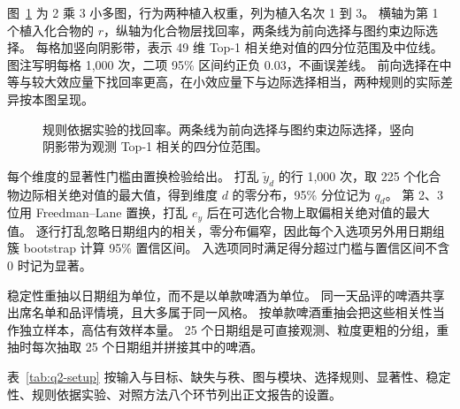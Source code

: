 图~\ref{fig:q2-recovery} 为 2 乘 3 小多图，行为两种植入权重，列为植入名次 1 到 3。
横轴为第 1 个植入化合物的 $r$，纵轴为化合物层找回率，两条线为前向选择与图约束边际选择。
每格加竖向阴影带，表示 49 维 Top-1 相关绝对值的四分位范围及中位线。
图注写明每格 1,000 次，二项 95\% 区间约正负 0.03，不画误差线。
前向选择在中等与较大效应量下找回率更高，在小效应量下与边际选择相当，两种规则的实际差异按本图呈现。

\begin{figure}[htbp]\centering
{}
\caption{规则依据实验的找回率。两条线为前向选择与图约束边际选择，竖向阴影带为观测 Top-1 相关的四分位范围。}
\label{fig:q2-recovery}
\end{figure}

每个维度的显著性门槛由置换检验给出。
打乱 $\tilde y_d$ 的行 1,000 次，取 225 个化合物边际相关绝对值的最大值，得到维度 $d$ 的零分布，95\% 分位记为 $q_d$。
第 2、3 位用 Freedman--Lane 置换，打乱 $e_y$ 后在可选化合物上取偏相关绝对值的最大值。
逐行打乱忽略日期组内的相关，零分布偏窄，因此每个入选项另外用日期组簇 bootstrap 计算 95\% 置信区间。
入选项同时满足得分超过门槛与置信区间不含 0 时记为显著。

稳定性重抽以日期组为单位，而不是以单款啤酒为单位。
同一天品评的啤酒共享出席名单和品评情境，且大多属于同一风格。
按单款啤酒重抽会把这些相关性当作独立样本，高估有效样本量。
25 个日期组是可直接观测、粒度更粗的分组，重抽时每次抽取 25 个日期组并拼接其中的啤酒。

表~\ref{tab:q2-setup} 按输入与目标、缺失与秩、图与模块、选择规则、显著性、稳定性、规则依据实验、对照方法八个环节列出正文报告的设置。

